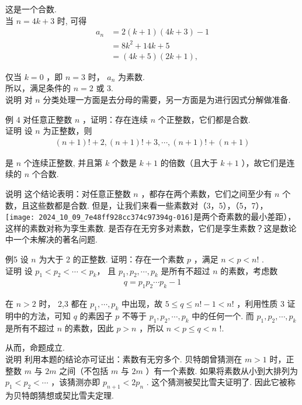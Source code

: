这是一个合数.\\
当 $n=4 k+3$ 时, 可得\\
\begin{align}
a_{n} & =2(k+1)(4 k+3)-1 \\
& =8 k^{2}+14 k+5 \\
& =(4 k+5)(2 k+1),
\end{align}

仅当 $k=0$ ，即 $n=3$ 时， $a_{n}$ 为素数. \\
所以，满足条件的 $n=2$ 或 3.\\
说明 对 $n$ 分类处理一方面是去分母的需要，另一方面是为进行因式分解做准备. 

例 4 对任意正整数 $n$ ，证明：存在连续 $n$ 个正整数，它们都是合数. \\
证明 设 $n$ 为正整数，则\\
\begin{align*}
(n+1)!+2,(n+1)!+3, \cdots,(n+1)!+(n+1)
\end{align*}

是 $n$ 个连续正整数, 并且第 $k$ 个数是 $k+1$ 的倍数（且大于 $k+1$ ），故它们是连续的 $n$ 个合数. 

说明 这个结论表明：对任意正整数 $n$ ，都存在两个素数，它们之间至少有 $n$ 个数，且这些数都是合数. 但是，让我们来看一些素数对（3，5），（5，7），\\
\texttt{[image: 2024\_10\_09\_7e48ff928cc374c97394g-016]}是两个奇素数的最小差距），这样的素数对称为孪生素数. 是否存在无穷多对素数，它们是孪生素数？这是数论中一个未解决的著名问题. 

例5 设 $n$ 为大于 2 的正整数. 证明：存在一个素数 $p$ ，满足 $n<p<n!$ . \\
证明 设 $p_{1}<p_{2}<\cdots<p_{k} ，$ 且 $p_{1}, p_{2}, \cdots, p_{k}$ 是所有不超过 $n$ 的素数，考虑数\\
\begin{align*}
q=p_{1} p_{2} \cdots p_{k}-1
\end{align*}

在 $n>2$ 时， 2,3 都在 $p_{1}, \cdots, p_{k}$ 中出现，故 $5 \leqslant q \leqslant n!-1<n!$ ，利用性质 3 证明中的方法，可知 $q$ 的素因子 $p$ 不等于 $p_{1}, p_{2}, \cdots, p_{k}$ 中的任何一个. 而 $p_{1}, p_{2}, \cdots, p_{k}$ 是所有不超过 $n$ 的素数，因此 $p>n$ ，所以 $n<p \leqslant q<n$ !.

从而，命题成立. \\
说明 利用本题的结论亦可证出：素数有无穷多个. 贝特朗曾猜测在 $m>1$ 时，正整数 $m$ 与 $2 m$ 之间（不包括 $m$ 与 $2 m$ ）有一个素数. 如果将素数从小到大排列为 $p_{1}<p_{2}<\cdots$ ，该猜测亦即 $p_{n+1}<2 p_{n}$ . 这个猜测被契比雪夫证明了. 因此它被称为贝特朗猜想或契比雪夫定理. 

